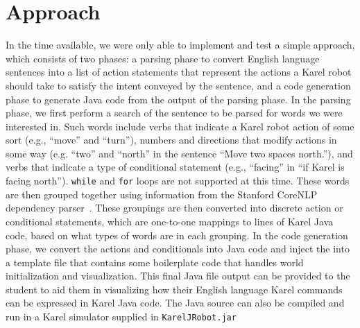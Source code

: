 \documentclass[11pt]{article}
\begin{document}
\section{Approach}
In the time available, we were only able to implement and test a simple approach, which consists of
two phases: a parsing phase to convert English language sentences into a list of action statements
that represent the actions a Karel robot should take to satisfy the intent conveyed by the
sentence, and a code generation phase to generate Java code from the output of the parsing phase.
In the parsing phase, we first perform a search of the sentence to be parsed for words we were
interested in. Such words include verbs that indicate a Karel robot action of some sort (e.g.,
``move'' and ``turn''), numbers and directions that modify actions in some way (e.g. ``two'' and
``north'' in the sentence ``Move two spaces north.''), and verbs that indicate a type of
conditional statement (e.g., ``facing'' in ``if Karel is facing north''). \texttt{while} and
\texttt{for} loops are not supported at this time. These words are then grouped together using
information from the Stanford CoreNLP dependency parser~\cite{Manning:2014aa}. These groupings are
then converted into discrete action or conditional statements, which are one-to-one mappings to
lines of Karel Java code, based on what types of words are in each grouping. In the code generation
phase, we convert the actions and conditionals into Java code and inject the into a template file
that contains some boilerplate code that handles world initialization and visualization. This final
Java file output can be provided to the student to aid them in visualizing how their English
language Karel commands can be expressed in Karel Java code. The Java source can also be compiled
and run in a Karel simulator supplied in \texttt{KarelJRobot.jar}
\end{document}
